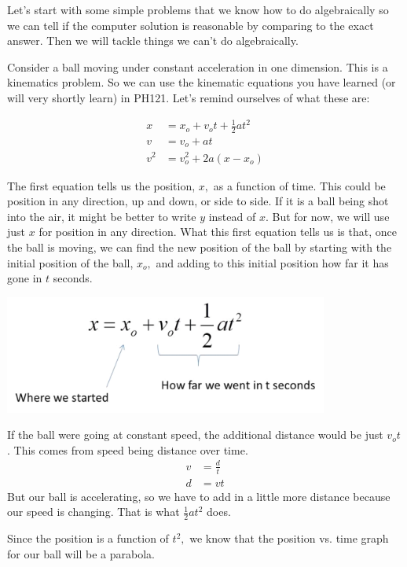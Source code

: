 \documentclass[twoside,11pt,ShortChapTitles]{BYUTextbook}
\begin{document}
Let's start with some simple problems that we know how to do algebraically so
we can tell if the computer solution is reasonable by comparing to the exact
answer. Then we will tackle things we can't do algebraically.

Consider a ball moving under constant acceleration in one dimension. This is a
kinematics problem. So we can use the kinematic equations you have learned (or
will very shortly learn) in PH121. Let's remind ourselves of what these are: 

\begin{align*}
x  & =x_{o}+v_{o}t+\frac{1}{2}at^{2}\\
v  & =v_{o}+at \\
v^{2}  & =v_{o}^{2}+2a\left(  x-x_{o}\right)
\end{align*}

The first equation tells us the position, $x,$ as a function of time. This
could be position in any direction, up and down, or side to side. If it is a
ball being shot into the air, it might be better to write $y$ instead of $x.$
But for now, we will use just $x$ for position in any direction. What this
first equation tells us is that, once the ball is moving, we can find the new
position of the ball by starting with the initial position of the ball,
$x_{o},$ and adding to this initial position how far it has gone in $t$
seconds.
\begin{center}
\includegraphics[width=0.8\textwidth]{Lab7_figs/kinematicsAnnotated.png} \end{center}
If the ball were going at constant speed, the additional distance would be
just $v_{o}t$. This comes from speed being distance over time.
\begin{align*}
v  & =\frac{d}{t}\\
d  & =vt
\end{align*}
But our ball is accelerating, so we have to add in a little more distance
because our speed is changing. That is what $\frac{1}{2}at^{2}$ does. 


Since the position is a function of $t^{2},$ we know that the position vs.
time graph for our ball will be a parabola.
\end{document}
